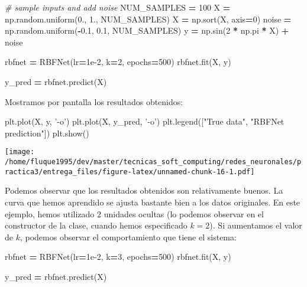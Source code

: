 \documentclass[
  a4paper,
,tablecaptionabove
]{scrartcl}
\newenvironment{Shaded}{\begin{snugshade}}{\end{snugshade}}
\newcommand{\CommentTok}[1]{\textcolor[rgb]{0.56,0.35,0.01}{\textit{#1}}}
\newcommand{\DecValTok}[1]{\textcolor[rgb]{0.00,0.00,0.81}{#1}}
\newcommand{\FloatTok}[1]{\textcolor[rgb]{0.00,0.00,0.81}{#1}}
\newcommand{\NormalTok}[1]{#1}
\newcommand{\OperatorTok}[1]{\textcolor[rgb]{0.81,0.36,0.00}{\textbf{#1}}}
\newcommand{\StringTok}[1]{\textcolor[rgb]{0.31,0.60,0.02}{#1}}
\begin{document}
\begin{Shaded}
\begin{Highlighting}[]
\CommentTok{# sample inputs and add noise}
\NormalTok{NUM_SAMPLES }\OperatorTok{=} \DecValTok{100}
\NormalTok{X }\OperatorTok{=}\NormalTok{ np.random.uniform(}\FloatTok{0.}\NormalTok{, }\FloatTok{1.}\NormalTok{, NUM_SAMPLES)}
\NormalTok{X }\OperatorTok{=}\NormalTok{ np.sort(X, axis}\OperatorTok{=}\DecValTok{0}\NormalTok{)}
\NormalTok{noise }\OperatorTok{=}\NormalTok{ np.random.uniform(}\OperatorTok{-}\FloatTok{0.1}\NormalTok{, }\FloatTok{0.1}\NormalTok{, NUM_SAMPLES)}
\NormalTok{y }\OperatorTok{=}\NormalTok{ np.sin(}\DecValTok{2} \OperatorTok{*}\NormalTok{ np.pi }\OperatorTok{*}\NormalTok{ X) }\OperatorTok{+}\NormalTok{ noise}

\NormalTok{rbfnet }\OperatorTok{=}\NormalTok{ RBFNet(lr}\OperatorTok{=}\FloatTok{1e-2}\NormalTok{, k}\OperatorTok{=}\DecValTok{2}\NormalTok{, epochs}\OperatorTok{=}\DecValTok{500}\NormalTok{)}
\NormalTok{rbfnet.fit(X, y)}

\NormalTok{y_pred }\OperatorTok{=}\NormalTok{ rbfnet.predict(X)}
\end{Highlighting}
\end{Shaded}

Mostramos por pantalla los resultados obtenidos:

\begin{Shaded}
\begin{Highlighting}[]
\NormalTok{plt.plot(X, y, }\StringTok{'-o'}\NormalTok{)}
\NormalTok{plt.plot(X, y_pred, }\StringTok{'-o'}\NormalTok{)}
\NormalTok{plt.legend([}\StringTok{"True data"}\NormalTok{, }\StringTok{"RBFNet prediction"}\NormalTok{])}
\NormalTok{plt.show()}
\end{Highlighting}
\end{Shaded}

\texttt{[image: /home/fluque1995/dev/master/tecnicas\_soft\_computing/redes\_neuronales/practica3/entrega\_files/figure-latex/unnamed-chunk-16-1.pdf]}

Podemos observar que los resultados obtenidos son relativamente buenos.
La curva que hemos aprendido se ajusta bastante bien a los datos
originales. En este ejemplo, hemos utilizado 2 unidades ocultas (lo
podemos observar en el constructor de la clase, cuando hemos
especificado \(k=2\)). Si aumentamos el valor de \(k\), podemos observar
el comportamiento que tiene el sistema:

\begin{Shaded}
\begin{Highlighting}[]
\NormalTok{rbfnet }\OperatorTok{=}\NormalTok{ RBFNet(lr}\OperatorTok{=}\FloatTok{1e-2}\NormalTok{, k}\OperatorTok{=}\DecValTok{3}\NormalTok{, epochs}\OperatorTok{=}\DecValTok{500}\NormalTok{)}
\NormalTok{rbfnet.fit(X, y)}

\NormalTok{y_pred }\OperatorTok{=}\NormalTok{ rbfnet.predict(X)}
\end{Highlighting}
\end{Shaded}
\end{document}
